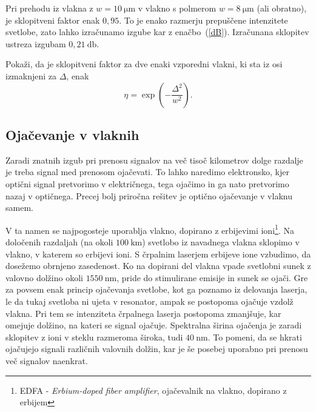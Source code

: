 Pri prehodu iz vlakna z $w = 10~\si{\micro\meter}$ v vlakno
s polmerom $w = 8~\si{\micro\meter}$ (ali obratno), je sklopitveni faktor enak $0,95$. 
To je enako razmerju prepuščene intenzitete svetlobe, zato lahko izračunamo izgube kar z
enačbo~(\ref{dB}). Izračunana sklopitev ustreza izgubam $0,21~\si{\decibel}$. 

\begin{definition}
Pokaži, da je sklopitveni faktor za dve enaki vzporedni vlakni, ki sta iz osi izmaknjeni
za $\Delta$, enak
\begin{equation}
\eta = \exp \left( - \frac{\Delta^2}{w^2}\right).
\end{equation}

\end{definition}

\subsection*{Ojačevanje v vlaknih}
Zaradi znatnih izgub pri prenosu signalov na več tisoč kilometrov dolge razdalje 
je treba signal med prenosom ojačevati. To lahko naredimo elektronsko, kjer optični signal 
pretvorimo v električnega, tega ojačimo in ga nato pretvorimo nazaj v optičnega. 
Precej bolj priročna rešitev je optično ojačevanje v vlaknu samem. 

V ta namen se najpogosteje uporablja vlakno, dopirano z erbijevimi 
ioni\footnote{EDFA - {\it Erbium-doped fiber amplifier}, 
ojačevalnik na vlakno, dopirano z erbijem}. 
Na določenih razdaljah (na okoli $100~\si{\kilo\meter}$) svetlobo iz navadnega vlakna 
sklopimo v vlakno, v katerem so erbijevi ioni.
S črpalnim laserjem erbijeve ione vzbudimo, da dosežemo obrnjeno zasedenost. 
Ko na dopirani del vlakna vpade svetlobni sunek z valovno dolžino okoli 
$1550~\si{\nano\meter}$, pride do stimulirane emisije in 
sunek se ojači. Gre za povsem enak princip ojačevanja svetlobe, kot ga poznamo iz 
delovanja laserja, le da tukaj svetloba ni ujeta v resonator, ampak se postopoma 
ojačuje vzdolž vlakna. Pri tem se intenziteta črpalnega laserja postopoma zmanjšuje,
kar omejuje dolžino, na kateri se signal ojačuje.
Spektralna širina ojačenja je zaradi sklopitev z ioni v steklu 
razmeroma široka, tudi $40~\si{\nano\meter}$. To pomeni, da se hkrati ojačujejo signali različnih 
valovnih dolžin, kar je še posebej uporabno pri prenosu več signalov naenkrat.


